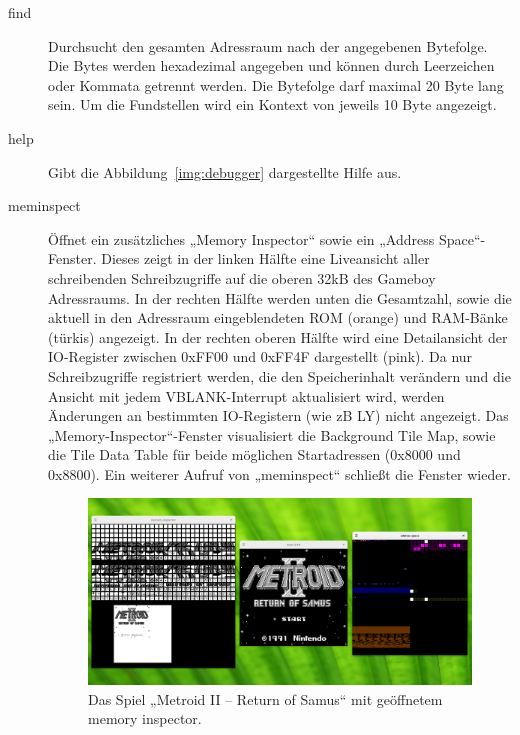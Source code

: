 \documentclass[a4paper]{scrartcl}
\begin{document}
\begin{description}
\item[find] Durchsucht den gesamten Adressraum nach der angegebenen Bytefolge. Die Bytes werden hexadezimal angegeben und können durch Leerzeichen oder Kommata getrennt werden. Die Bytefolge darf maximal 20 Byte lang sein. Um die Fundstellen wird ein Kontext von jeweils 10 Byte angezeigt.
\item[help] Gibt die Abbildung~\ref{img:debugger} dargestellte Hilfe aus.
\item[meminspect] Öffnet ein zusätzliches „Memory Inspector“ sowie ein „Address Space“-Fenster. Dieses zeigt in der linken Hälfte eine Liveansicht aller schreibenden Schreibzugriffe auf die oberen 32kB des Gameboy Adressraums. In der rechten Hälfte werden unten die Gesamtzahl, sowie die aktuell in den Adressraum eingeblendeten ROM (orange) und RAM-Bänke (türkis) angezeigt. In der rechten oberen Hälfte wird eine Detailansicht der IO-Register zwischen 0xFF00 und 0xFF4F dargestellt (pink). Da nur Schreibzugriffe registriert werden, die den Speicherinhalt verändern und die Ansicht mit jedem VBLANK-Interrupt aktualisiert wird, werden Änderungen an bestimmten IO-Registern (wie zB LY) nicht angezeigt. Das „Memory-Inspector“-Fenster visualisiert die Background Tile Map, sowie die Tile Data Table für beide möglichen Startadressen (0x8000 und 0x8800). Ein weiterer Aufruf von „meminspect“ schließt die Fenster wieder.

\begin{figure}[htbp]
\centering
\includegraphics[width=\linewidth]{img/meminspect}
\caption{Das Spiel „Metroid II -- Return of Samus“ mit geöffnetem memory inspector.}
\label{img:meminspect}
\end{figure}


\end{description}
\end{document}
